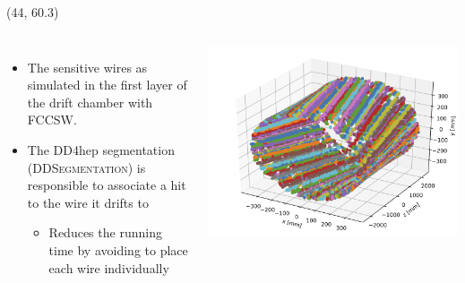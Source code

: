 \documentclass[final,xcolor={dvipsnames,svgnames,x11names,table}]{beamer}
\begin{document}
\begin{frame}
\begin{textblock}{43}
\begin{tcolorbox}[title=The IDEA drift chamber]
\begin{columns}
    \end{columns}

  \vspace{0.5cm}

  \end{tcolorbox}
\end{textblock}


\begin{textblock}{39.5}(44, 60.3)
  \begin{tcolorbox}[title=The simulation of the drift chamber with FCCSW]

    \begin{columns}
      \begin{itemize}
        \item The sensitive wires as simulated in the first layer of the drift chamber with FCCSW. \vspace{0.5cm}
        \item The DD4hep segmentation (\textsc{DDSegmentation}) is responsible to associate a hit to the wire it drifts to \vspace{0.2cm}
          \begin{itemize}
            \item Reduces the running time by avoiding to place each wire individually
          \end{itemize}
      \end{itemize}

        \centering
        \includegraphics[width=\textwidth]{Figures/allHits}


\end{columns}
\end{tcolorbox}
\end{textblock}
\end{frame}
\end{document}
